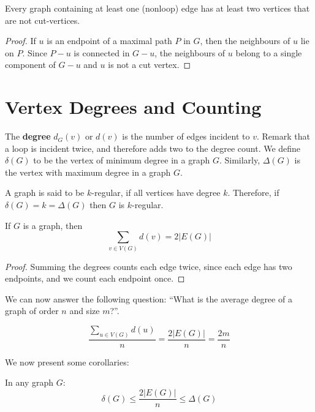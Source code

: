 \begin{proposition}
	Every graph containing at least one (nonloop) edge has at least two vertices that are not cut-vertices.
\end{proposition}
\begin{proof}
	If $u$ is an endpoint of a maximal path $P$ in $G$, then the neighbours of $u$ lie on $P$. Since $P-u$ is connected in $G-u$, the neighbours of $u$ belong to a single component of $G-u$ and $u$ is not a cut vertex.
\end{proof}

\section{Vertex Degrees and Counting}%
\label{sec:1.3}


The \textbf{degree} $d_{G}(v)$ or $d(v)$ is the number of edges incident to $v$. Remark that a loop is incident twice, and therefore adds two to the degree count. We define $\delta(G)$ to be the vertex of minimum degree in a graph $G$. Similarly, $\Delta(G)$ is the vertex with maximum degree in a graph $G$.

A graph is said to be $k$-regular, if all vertices have degree $k$. Therefore, if $\delta(G) = k = \Delta(G)$ then $G$ is $k$-regular.

\begin{theorem}
	If $G$ is a graph, then
	\begin{equation}
		\sum_{v \in V(G)} d(v) = 2|E(G)|
	\end{equation}
\end{theorem}
\begin{proof}
	Summing the degrees counts each edge twice, since each edge has two endpoints, and we count each endpoint once.
\end{proof}

We can now answer the following question: ``What is the average degree of a graph of order $n$ and size $m$?''.

\begin{equation}
	\frac{\sum_{u \in V(G)} d(u)}{n} = \frac{2|E(G)|}{n} = \frac{2m}{n}
\end{equation}

We now present some corollaries:

\begin{corollary}
	In any graph $G$:
	\begin{equation}
		\delta(G) \le \frac{2|E(G)|}{n} \le \Delta(G)
	\end{equation}
\end{corollary}

